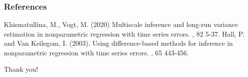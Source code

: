 \documentclass[10pt]{beamer}
\begin{document}
\begin{frame}%
  \frametitle<presentation>{References}    
  \begin{thebibliography}{10}    
  \beamertemplatearticlebibitems
    Khismatullina, M., Vogt, M. (2020)
    \newblock Multiscale inference and long-run variance estimation in nonparametric regression with time series errors.
    , 82 5-37.
  Hall, P. and Van Keilegom, I. (2003).
  \newblock Using difference-based methods for inference in nonparametric regression with time series errors.
    , 65 443-456.
  \end{thebibliography}
\end{frame}

\begin{frame}[standout]
  Thank you!
\end{frame}




\appendix
\end{document}
